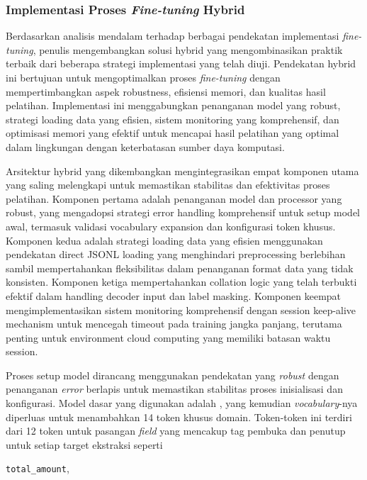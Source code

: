 \subsubsection{Implementasi Proses \emph{Fine-tuning} Hybrid}
\label{subsubsec:implementasi-proses-fine-tuning-hybrid}

Berdasarkan analisis mendalam terhadap berbagai pendekatan implementasi \emph{fine-tuning}, penulis mengembangkan solusi hybrid yang mengombinasikan praktik terbaik dari beberapa strategi implementasi yang telah diuji. Pendekatan hybrid ini bertujuan untuk mengoptimalkan proses \emph{fine-tuning} dengan mempertimbangkan aspek robustness, efisiensi memori, dan kualitas hasil pelatihan. Implementasi ini menggabungkan penanganan model yang robust, strategi loading data yang efisien, sistem monitoring yang komprehensif, dan optimisasi memori yang efektif untuk mencapai hasil pelatihan yang optimal dalam lingkungan dengan keterbatasan sumber daya komputasi.

Arsitektur hybrid yang dikembangkan mengintegrasikan empat komponen utama yang saling melengkapi untuk memastikan stabilitas dan efektivitas proses pelatihan. Komponen pertama adalah penanganan model dan processor yang robust, yang mengadopsi strategi error handling komprehensif untuk setup model awal, termasuk validasi vocabulary expansion dan konfigurasi token khusus. Komponen kedua adalah strategi loading data yang efisien menggunakan pendekatan direct JSONL loading yang menghindari preprocessing berlebihan sambil mempertahankan fleksibilitas dalam penanganan format data yang tidak konsisten. Komponen ketiga mempertahankan collation logic yang telah terbukti efektif dalam handling decoder input dan label masking. Komponen keempat mengimplementasikan sistem monitoring komprehensif dengan session keep-alive mechanism untuk mencegah timeout pada training jangka panjang, terutama penting untuk environment cloud computing yang memiliki batasan waktu session.

Proses setup model dirancang menggunakan pendekatan yang \textit{robust} dengan penanganan \textit{error} berlapis untuk memastikan stabilitas proses inisialisasi dan konfigurasi. Model dasar yang digunakan adalah \donutcord, yang kemudian \textit{vocabulary}-nya diperluas untuk menambahkan 14 token khusus domain. Token-token ini terdiri dari 12 token untuk pasangan \textit{field} yang mencakup tag pembuka dan penutup untuk setiap target ekstraksi seperti

 \texttt{total\_amount}, 
 
